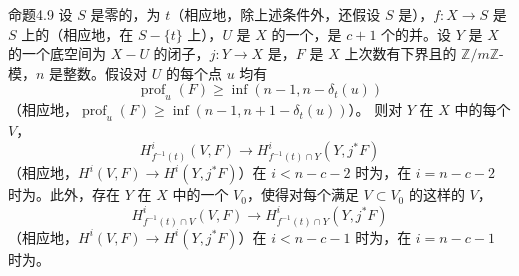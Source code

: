 \begin{SGAresult}{命题}{4.9}
设 $S$ 是零的，为 $t$（相应地，除上述条件外，还假设 $S$ 是），$f:X\to S$ 是 $S$ 上的（相应地，在 $S-\{t\}$ 上），$U$ 是 $X$ 的一个，是 $c+1$ 个的并。设 $Y$ 是 $X$ 的一个底空间为 $X-U$ 的闭子，$j:Y\to X$ 是，$F$ 是 $X$ 上次数有下界且的 $\mathbb Z/m\mathbb Z$-模，$n$ 是整数。假设对 $U$ 的每个点 $u$ 均有
\[
\operatorname{prof}_u(F)\geq\inf(n-1,n-\delta_t(u))
\]
（相应地，$\operatorname{prof}_u(F)\geq\inf(n-1,n+1-\delta_t(u))$）。
则对 $Y$ 在 $X$ 中的每个 $V$，
\[
H^i_{f^{-1}(t)}(V,F)\longrightarrow H^i_{f^{-1}(t)\cap Y}(Y,j^*F)
\]
（相应地，$H^i(V,F)\to H^i(Y,j^*F)$）在 $i<n-c-2$ 时为，在 $i=n-c-2$ 时为。此外，存在 $Y$ 在 $X$ 中的一个 $V_0$，使得对每个满足 $V\subset V_0$ 的这样的 $V$，
\[
H^i_{f^{-1}(t)\cap V}(V,F)\longrightarrow H^i_{f^{-1}(t)\cap Y}(Y,j^*F)
\]
（相应地，$H^i(V,F)\to H^i(Y,j^*F)$）在 $i<n-c-1$ 时为，在 $i=n-c-1$ 时为。
\end{SGAresult}
